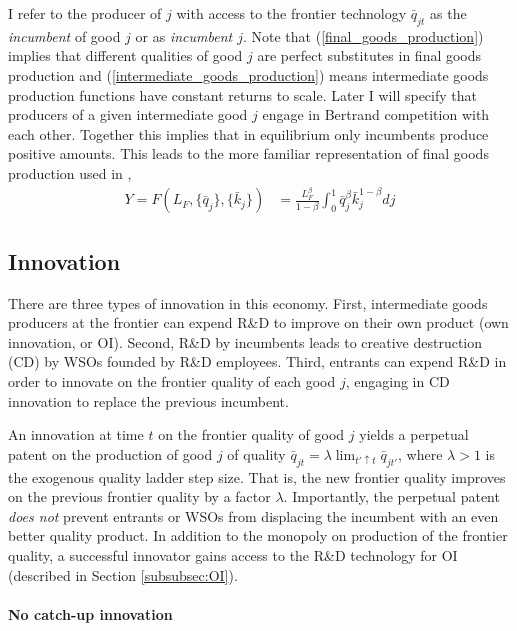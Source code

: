 \documentclass[11pt,english]{article}
\begin{document}
I refer to the producer of $j$ with access to the frontier technology $\bar{q}_{jt}$ as the \textit{incumbent} of good $j$ or as \textit{incumbent $j$}. Note that (\ref{final_goods_production}) implies that different qualities of good $j$ are perfect substitutes in final goods production and (\ref{intermediate_goods_production}) means intermediate goods production functions have constant returns to scale. Later I will specify that producers of a given intermediate good $j$ engage in Bertrand competition with each other. Together this implies that in equilibrium only incumbents produce positive amounts. This leads to the more familiar representation of final goods production used in  \cite{acemoglu_introduction_2009},
\begin{align}
	Y = F(L_F,\{\bar{q}_j\},\{\bar{k}_j\}) &= \frac{L_F^{\beta}}{1-\beta} \int_0^1 \bar{q}_j^{\beta} \bar{k}_j^{1-\beta} dj  \label{eq_final_goods_production}
\end{align}

\subsection{Innovation}\label{subsec:innovation}

There are three types of innovation in this economy. First, intermediate goods producers at the frontier can expend R\&D to improve on their own product (own innovation, or OI). Second, R\&D by incumbents leads to creative destruction (CD) by WSOs founded by R\&D employees. Third, entrants can expend R\&D in order to innovate on the frontier quality of each good $j$, engaging in CD innovation to replace the previous incumbent.

An innovation at time $t$ on the frontier quality of good $j$ yields a perpetual patent on the production of good $j$ of quality $\bar{q}_{jt} = \lambda \lim_{t' \uparrow t} \bar{q}_{jt'}$, where $\lambda > 1$ is the exogenous quality ladder step size. That is, the new frontier quality improves on the previous frontier quality by a factor $\lambda$. Importantly, the perpetual patent \textit{does not} prevent entrants or WSOs from displacing the incumbent with an even better quality product. In addition to the monopoly on production of the frontier quality, a successful innovator gains access to the R\&D technology for OI (described in Section \ref{subsubsec:OI}).

\paragraph{No catch-up innovation}
\end{document}

